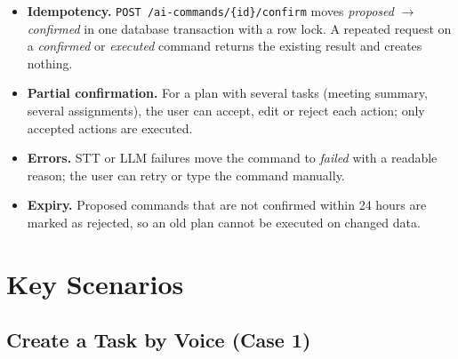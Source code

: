 \documentclass[11pt,a4paper]{article}
\newcommand{\code}[1]{\texttt{#1}}
\begin{document}
\begin{itemize}
  \item \textbf{Idempotency.} \code{POST /ai-commands/\{id\}/confirm} moves \textit{proposed} $\rightarrow$ \textit{confirmed} in one database transaction with a row lock. A repeated request on a \textit{confirmed} or \textit{executed} command returns the existing result and creates nothing.
  \item \textbf{Partial confirmation.} For a plan with several tasks (meeting summary, several assignments), the user can accept, edit or reject each action; only accepted actions are executed.
  \item \textbf{Errors.} STT or LLM failures move the command to \textit{failed} with a readable reason; the user can retry or type the command manually.
  \item \textbf{Expiry.} Proposed commands that are not confirmed within 24 hours are marked as rejected, so an old plan cannot be executed on changed data.
\end{itemize}

\section{Key Scenarios}

\subsection{Create a Task by Voice (Case 1)}
\end{document}
